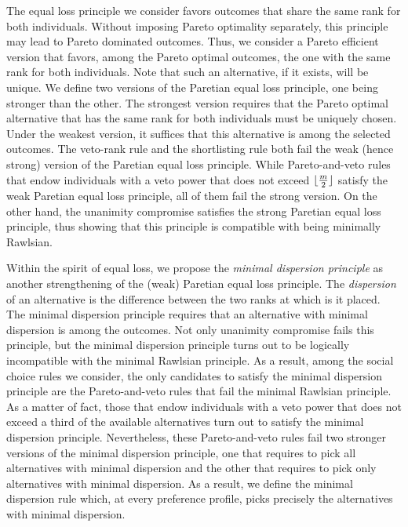 \documentclass[pagesize, twoside=off, bibliography=totoc, DIV=calc, fontsize=12pt, a4paper]{scrartcl}
\begin{document}
The equal loss principle we consider favors outcomes that share the same rank for both individuals. Without imposing Pareto optimality separately, this principle may lead to Pareto dominated outcomes. Thus, we consider a Pareto efficient version that favors, among the Pareto optimal outcomes, the one with the same rank for both individuals. Note that such an alternative, if it exists, will be unique. We define two versions of the Paretian equal loss principle, one being stronger than the other. The strongest version requires that the Pareto optimal alternative that has the same rank for both individuals must be uniquely chosen. Under the weakest version, it suffices that this alternative is among the selected outcomes. The veto-rank rule and the shortlisting rule both fail the weak (hence strong) version of the Paretian equal loss principle. While Pareto-and-veto rules that endow individuals with a veto power that does not exceed $\lfloor\frac{m}{2}\rfloor$ satisfy the weak Paretian equal loss principle, all of them fail the strong version. On the other hand, the unanimity compromise satisfies the strong Paretian equal loss principle, thus showing that this principle is compatible with being minimally Rawlsian.

Within the spirit of equal loss, we propose the \textit{minimal dispersion principle} as another strengthening of the (weak) Paretian equal loss principle. The \textit{dispersion} of an alternative is the difference between the two ranks at which is it placed. The minimal dispersion principle requires that an alternative with minimal dispersion is among the outcomes. Not only unanimity compromise fails this principle, but the minimal dispersion principle turns out to be logically incompatible with the minimal Rawlsian principle. As a result, among the social choice rules we consider, the only candidates to satisfy the minimal dispersion principle are the Pareto-and-veto rules that fail the minimal Rawlsian principle. As a matter of fact, those that endow individuals with a veto power that does not exceed a third of the available alternatives turn out to satisfy the minimal dispersion principle. Nevertheless, these Pareto-and-veto rules fail two stronger versions of the minimal dispersion principle, one that requires to pick all alternatives with minimal dispersion and the other that requires to pick only alternatives with minimal dispersion. As a result, we define the minimal dispersion rule which, at every preference profile, picks precisely the alternatives with minimal dispersion.
\end{document}
